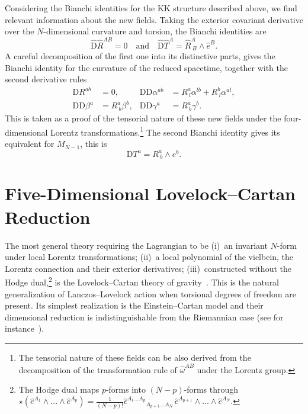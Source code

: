 \documentclass[aps,prd,12pt,superscriptaddress,showpacs,showkeys,reprint,nofootinbib]{revtex4-1}
\begin{document}
Considering the Bianchi identities for the KK structure described above, we find relevant information about the new fields. Taking the exterior covariant derivative over the $N$-dimensional curvature and torsion, the Bianchi identities are
\begin{equation}
  \hat{\text{D}}\hat{R}^{AB} = 0 \quad \text{and} \quad \hat{\text{D}}\hat{T}^A = \hat{R}^A_{\ B}\wedge\hat{e}^B.
\end{equation}
A careful decomposition of the first one into its distinctive parts, gives the Bianchi identity for the curvature of the reduced spacetime, together with the second derivative rules
\begin{equation}
  \begin{aligned}
    \text{D}R^{ab} &=0, & \text{D}\mbox{D}\alpha^{ab} &=R^a_{\ l}\alpha^{lb}+R^b_{\ l}\alpha^{al},\\
    \text{D}\text{D}\beta^a &= R^a_{\ b}\beta^{b}, & \text{D}\text{D}\gamma^a &= R^a_{\ b}\gamma^{b}.
  \end{aligned}
\end{equation}
This is taken as a proof of the tensorial nature of these new fields under the four-dimensional Lorentz transformations.\footnote{The tensorial nature of these fields can be also derived from the decomposition of the transformation rule of $\hat{\omega}^{AB}$ under the Lorentz group.} The second Bianchi identity gives its equivalent for $M_{N-1}$, this is
\begin{equation*}
  \mbox{D}T^a=R^a_{\ b}\wedge e^b.
\end{equation*}


\section{Five-Dimensional Lovelock--Cartan Reduction\label{5EGB}}

The most general theory requiring the Lagrangian to be (i)~an invariant $N$-form under local Lorentz transformations; (ii)~a local polynomial of the vielbein, the Lorentz connection and their exterior derivatives; (iii)~constructed without the Hodge dual,\footnote{The Hodge dual maps $p$-forms into $(N-p)$-forms through $\star\left(\hat{e}^{A_1}\wedge ... \wedge\hat{e}^{A_p}\right) = \frac{1}{(N-p)!}\hat{\epsilon}^{A_1\ldots A_p}{}_{A_{p+1}...A_N}\,\hat{e}^{A_{p+1}}\wedge ... \wedge\hat{e}^{A_N}$.} is the Lovelock--Cartan theory of gravity~\cite{Mardones:1990qc}. This is the natural generalization of Lanczos--Lovelock action when torsional degrees of freedom are present. Its simplest realization is the Einstein--Cartan model and their dimensional reduction is indistinguishable from the Riemannian case (see for instance~\cite{German:1993bq,Aros:2007nn}). 
\end{document}
